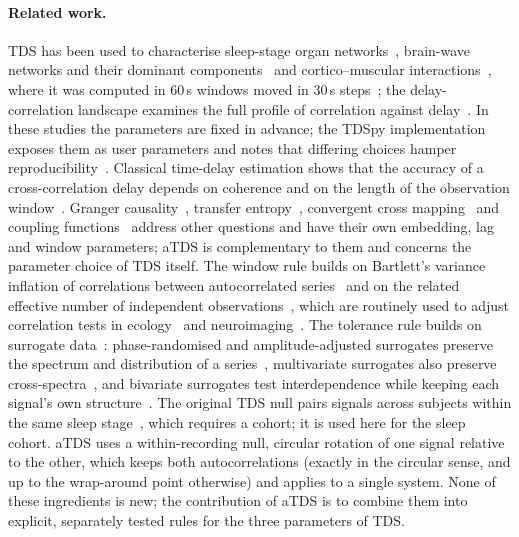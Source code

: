 \documentclass[11pt,a4paper]{article}
\begin{document}
\paragraph{Related work.}
TDS has been used to characterise sleep-stage organ networks~\cite{Bashan2012NetworkPhysiology,Bartsch2015NetworkPhysiology}, brain-wave networks and their dominant components~\cite{Liu2015PlasticityBrain,Liu2015MajorComponent} and cortico--muscular interactions~\cite{Rizzo2020NetworkPhysiology,Rizzo2022DynamicNetworks}, where it was computed in 60\,s windows moved in 30\,s steps~\cite{Rizzo2020NetworkPhysiology}; the delay-correlation landscape examines the full profile of correlation against delay~\cite{Lin2016DelaycorrelationLandscape}. In these studies the parameters are fixed in advance; the TDSpy implementation exposes them as user parameters and notes that differing choices hamper reproducibility~\cite{Steinbrinker2024TdspyOpensource}. Classical time-delay estimation shows that the accuracy of a cross-correlation delay depends on coherence and on the length of the observation window~\cite{Knapp1976GeneralizedCorrelation,Carter1987CoherenceTime}. Granger causality~\cite{Granger1969InvestigatingCausal}, transfer entropy~\cite{Schreiber2000MeasuringInformation}, convergent cross mapping~\cite{Sugihara2012DetectingCausality} and coupling functions~\cite{Stankovski2017CouplingFunctions} address other questions and have their own embedding, lag and window parameters; aTDS is complementary to them and concerns the parameter choice of TDS itself. The window rule builds on Bartlett's variance inflation of correlations between autocorrelated series~\cite{Bartlett1946TheoreticalSpecification} and on the related effective number of independent observations~\cite{Bayley1946EffectiveNumber}, which are routinely used to adjust correlation tests in ecology~\cite{Pyper1998ComparisonMethods} and neuroimaging~\cite{Afyouni2019EffectiveDegrees}. The tolerance rule builds on surrogate data~\cite{Theiler1992TestingNonlinearity,Schreiber2000SurrogateTime,Lancaster2018SurrogateData}: phase-randomised and amplitude-adjusted surrogates preserve the spectrum and distribution of a series~\cite{Theiler1992TestingNonlinearity,Schreiber1996ImprovedSurrogate}, multivariate surrogates also preserve cross-spectra~\cite{Prichard1994GeneratingSurrogate}, and bivariate surrogates test interdependence while keeping each signal's own structure~\cite{Andrzejak2003BivariateSurrogate}. The original TDS null pairs signals across subjects within the same sleep stage~\cite{Bashan2012NetworkPhysiology}, which requires a cohort; it is used here for the sleep cohort. aTDS uses a within-recording null, circular rotation of one signal relative to the other, which keeps both autocorrelations (exactly in the circular sense, and up to the wrap-around point otherwise) and applies to a single system. None of these ingredients is new; the contribution of aTDS is to combine them into explicit, separately tested rules for the three parameters of TDS.
\end{document}
